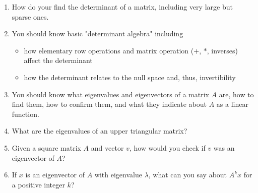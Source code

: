 \documentclass[11pt,fleqn]{article}
\begin{document}
\begin{enumerate}
	\item How do your find the determinant of a matrix, including very large but sparse ones. 
	\item You should know basic "determinant algebra" including
		\begin{itemize}
		\item how elementary row operations and matrix operation ($+$, $*$, inverses) affect the determinant
		\item how the determinant relates to the null space and, thus, invertibility
		\end{itemize}
	\item You should know what eigenvalues and eigenvectors of a matrix $A$ are, how to find them, how to confirm them, and what they indicate about $A$ as a linear function.
	\item What are the eigenvalues of an upper triangular matrix? 
	\item Given a square matrix $A$ and vector $v$, how would you check if $v$ was an eigenvector of $A$? 
	\item If $x$ is an eigenvector of $A$ with eigenvalue $\lambda$, what can you say about $A^kx$ for a positive integer $k$?
	\end{enumerate}
\end{document}

